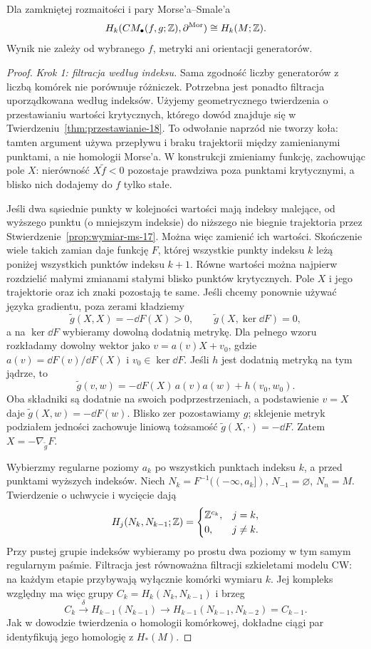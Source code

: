 \begin{twierdzenie}
\label{thm:homologia-morse-17}
Dla zamkniętej rozmaitości
i pary Morse'a--Smale'a
\[
 H_k(CM_\bullet(f,g;\mathbb{Z}),
          \partial^{\mathrm{Mor}})
       \cong H_k(M;\mathbb{Z}).
\]
Wynik nie zależy od
wybranego $f$, metryki
ani orientacji generatorów.
\end{twierdzenie}
\begin{proof}
\emph{Krok 1: filtracja według indeksu.}
Sama zgodność liczby generatorów z liczbą komórek
nie porównuje różniczek. Potrzebna jest ponadto
filtracja uporządkowana według indeksów.
Użyjemy geometrycznego twierdzenia o przestawianiu
wartości krytycznych, którego dowód znajduje się
w Twierdzeniu~\ref{thm:przestawianie-18}.
To odwołanie naprzód nie tworzy koła: tamten argument
używa przepływu i braku trajektorii między zamienianymi
punktami, a nie homologii Morse'a.
W konstrukcji zmieniamy funkcję, zachowując pole $X$:
nierówność $X\widetilde f<0$ pozostaje prawdziwa
poza punktami krytycznymi, a blisko nich dodajemy
do $f$ tylko stałe.

Jeśli dwa sąsiednie punkty w kolejności wartości
mają indeksy malejące, od wyższego punktu
(o mniejszym indeksie) do niższego nie biegnie
trajektoria przez Stwierdzenie~\ref{prop:wymiar-ms-17}.
Można więc zamienić ich wartości. Skończenie wiele
takich zamian daje funkcję $F$, której wszystkie
punkty indeksu $k$ leżą poniżej wszystkich punktów
indeksu $k+1$. Równe wartości można najpierw rozdzielić
małymi zmianami stałymi blisko punktów krytycznych.
Pole $X$ i jego trajektorie oraz ich znaki pozostają te same.
Jeśli chcemy ponownie używać języka gradientu,
poza zerami kładziemy
\[
 \widetilde g(X,X)=-\dd F(X)>0,\qquad
 \widetilde g(X,\ker\dd F)=0,
\]
a na $\ker\dd F$ wybieramy dowolną dodatnią metrykę.
Dla pełnego wzoru rozkładamy dowolny wektor jako
$v=a(v)X+v_0$, gdzie
$a(v)=\dd F(v)/\dd F(X)$ i $v_0\in\ker\dd F$.
Jeśli $h$ jest dodatnią metryką na tym jądrze, to
\[
 \widetilde g(v,w)
 =-\dd F(X)\,a(v)a(w)+h(v_0,w_0).
\]
Oba składniki są dodatnie na swoich podprzestrzeniach,
a podstawienie $v=X$ daje
$\widetilde g(X,w)=-\dd F(w)$.
Blisko zer pozostawiamy $g$; sklejenie metryk podziałem
jedności zachowuje liniową tożsamość
$\widetilde g(X,\cdot)=-\dd F$.
Zatem $X=-\nabla_{\widetilde g}F$.

Wybierzmy regularne poziomy $a_k$ po wszystkich
punktach indeksu $k$, a przed punktami wyższych indeksów.
Niech $N_k=F^{-1}(( -\infty,a_k])$,
$N_{-1}=\varnothing$, $N_n=M$.
Twierdzenie o uchwycie i wycięcie dają
\[
 H_j(N_k,N_{k-1};\mathbb{Z})=
 \begin{cases}\mathbb{Z}^{c_k},&j=k,\\0,&j\ne k.\end{cases}
\]
Przy pustej grupie indeksów wybieramy po prostu
dwa poziomy w tym samym regularnym paśmie.
Filtracja jest równoważna filtracji szkieletami
modelu CW: na każdym etapie przybywają wyłącznie
komórki wymiaru $k$. Jej kompleks względny ma więc
grupy $C_k=H_k(N_k,N_{k-1})$ i brzeg
\[
 C_k\xrightarrow{\delta}H_{k-1}(N_{k-1})
       \longrightarrow H_{k-1}(N_{k-1},N_{k-2})=C_{k-1}.
\]
Jak w dowodzie twierdzenia o homologii komórkowej,
dokładne ciągi par identyfikują jego homologię z $H_*(M)$.


\end{proof}
